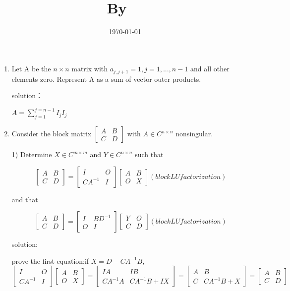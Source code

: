 \documentclass{article}
\title{
    \vspace{2in}
    \textmd{\textbf{\hmwkClass\\ \hmwkTitle}}\\
    \normalsize\vspace{0.1in}\small{By\ \textit{\hmwkClassInstructor\ \hmwkClassTime }}\\
    \vspace{3in}
}
\author{\textbf{\hmwkAuthorName}}
\date{\today}
\begin{document}
	\maketitle
	\newpage
	\begin{enumerate}
		\item %
		Let A be the $n \times n$ matrix with $a_{j,j+1}=1,j=1,...,n-1$ and all other elements zero. Represent A as a sum of vector outer products.
		
		solution：
		
		     $A=\sum_{j=1}^{j=n-1}{ I_{j}I_{j} }$
		
		\item%
		Consider the block matrix
		 $\begin{bmatrix}A&B\\C&D\end{bmatrix}$ with $A \in C^{n \times n}$ nonsingular.
		
		1) Determine $X \in C^{m \times m}$ and $Y \in C^{n \times n}$ such that
		
		\[ \begin{bmatrix} A&B\\C&D \end{bmatrix} = \begin{bmatrix} I&O\\{CA^{-1}}&I \end{bmatrix} \begin{bmatrix} A&B\\O&X \end{bmatrix} (block LU factorization)\] 
		
		and that
		
		\[ \begin{bmatrix} A&B\\C&D \end{bmatrix} = \begin{bmatrix} I&BD^{-1}\\O&I \end{bmatrix} \begin{bmatrix} Y&O\\C&D \end{bmatrix} (block LU factorization)\] 
		
		solution:
		
		prove the first equation:if $X=D-CA^{-1}B$,\[ \begin{bmatrix} I&O\\{CA^{-1}}&I \end{bmatrix} \begin{bmatrix} A&B\\O&X \end{bmatrix}
		= \begin{bmatrix} IA & IB \\ CA^{-1}A & CA^{-1}B+IX \end{bmatrix}
		= \begin{bmatrix} A & B \\ C & CA^{-1}B+X \end{bmatrix}
		=\begin{bmatrix} A&B\\C&D \end{bmatrix}
		\] 
		

\end{enumerate}
\end{document}
